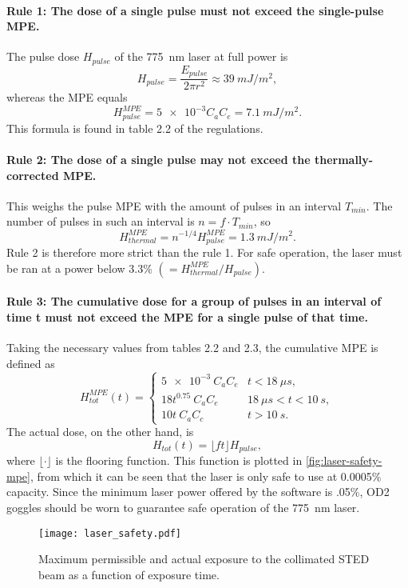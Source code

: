 \paragraph{Rule 1: The dose of a single pulse must not exceed the single-pulse MPE.} The pulse dose $ H_\mathit{pulse} $ of the 775~nm laser at full power is
\begin{equation}
	H_\mathit{pulse} = \frac{E_\mathit{pulse}}{2\pi r^2} \approx \SI{39}{mJ/m^2},
\end{equation}
whereas the MPE equals
\begin{equation}
	H_\mathit{pulse}^\mathit{MPE} = \num{5e-3} C_a C_e = \SI{7.1}{mJ/m^2}.
\end{equation}
This formula is found in table 2.2 of the regulations.

\paragraph{Rule 2: The dose of a single pulse may not exceed the thermally-corrected MPE.} This weighs the pulse MPE with the amount of pulses in an interval $ T_\mathit{min} $. The number of pulses in such an interval is $ n = f\cdot T_\mathit{min} $, so
\begin{equation}
	H_\mathit{thermal}^\mathit{MPE} =  n^{-1/4} H_\mathit{pulse}^\mathit{MPE} = \SI{1.3}{mJ/m^2}.
\end{equation}
Rule 2 is therefore more strict than the rule 1. For safe operation, the laser must be ran at a power below 3.3\% $ (=H^\mathit{MPE}_\mathit{thermal} / H_\mathit{pulse}) $.

\paragraph{Rule 3: The cumulative dose for a group of pulses in an interval of time t must not exceed the MPE for a single pulse of that time.} Taking the necessary values from tables 2.2 and 2.3, the cumulative MPE is defined as
\begin{equation}
	H_\mathit{tot}^\mathit{MPE}(t) = \left\{\begin{array}{rl}
		\num{5e-3} \:C_a C_e &  t<\SI{18}{\mu s,} \\
		18 t^{0.75} \:C_a C_e &  \SI{18}{\mu s} < t < \SI{10}{s}, \\
		10 t\:C_a C_c  &t> \SI{10}{s}.
	\end{array}\right.
\end{equation}
The actual dose, on the other hand, is
\begin{equation}
	H_\mathit{tot}(t) = \lfloor ft \rfloor H_\mathit{pulse},
\end{equation}
where $ \lfloor \cdot \rfloor$ is the flooring function. This function is plotted in \autoref{fig:laser-safety-mpe}, from which it can be seen that the laser is only safe to use at 0.0005\% capacity. Since the minimum laser power offered by the software is .05\%, OD2 goggles should be worn to guarantee safe operation of the 775~nm laser.

\begin{figure}
	\centering
	\texttt{[image: laser\_safety.pdf]}
	\caption{Maximum permissible  and actual exposure to the collimated STED beam as a function of exposure time.}
	\label{fig:laser-safety-mpe}
\end{figure}

